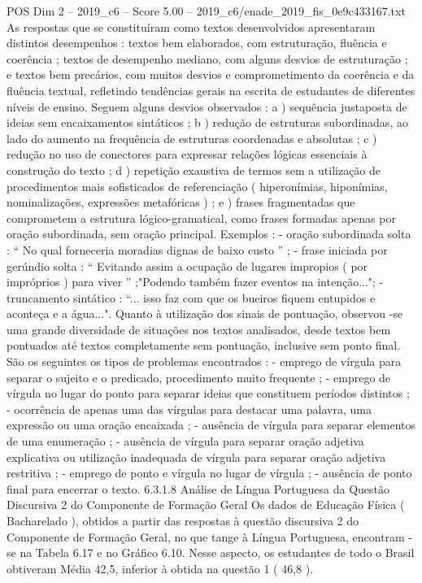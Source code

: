 \begin{textsample}{POS Dim 2 – 2019\_c6 – Score 5.00 – 2019\_c6/enade\_2019\_fis\_0e9c433167.txt}
As respostas que se constituíram como textos desenvolvidos apresentaram distintos desempenhos : textos bem elaborados, com estruturação, fluência e coerência ; textos de desempenho mediano, com alguns desvios de estruturação ; e textos bem precários, com muitos desvios e comprometimento da coerência e da fluência textual, refletindo tendências gerais na escrita de estudantes de diferentes níveis de ensino.
Seguem alguns desvios observados : a ) sequência justaposta de ideias sem encaixamentos sintáticos ; b ) redução de estruturas subordinadas, ao lado do aumento na frequência de estruturas coordenadas e absolutas ; c ) redução no uso de conectores para expressar relações lógicas essenciais à construção do texto ; d ) repetição exaustiva de termos sem a utilização de procedimentos mais sofisticados de referenciação ( hiperonímias, hiponímias, nominalizações, expressões metafóricas ) ; e ) frases fragmentadas que comprometem a estrutura lógico-gramatical, como frases formadas apenas por oração subordinada, sem oração principal.
Exemplos : - oração subordinada solta : “ No qual forneceria moradias dignas de baixo custo ” ; - frase iniciada por gerúndio solta : “ Evitando assim a ocupação de lugares impropios ( por impróprios ) para viver ” ;"Podendo também fazer eventos na intenção..."; - truncamento sintático : “... isso faz com que os bueiros fiquem entupidos e aconteça e a água...".
Quanto à utilização dos sinais de pontuação, observou -se uma grande diversidade de situações nos textos analisados, desde textos bem pontuados até textos completamente sem pontuação, inclusive sem ponto final.
São os seguintes os tipos de problemas encontrados : - emprego de vírgula para separar o sujeito e o predicado, procedimento muito frequente ; - emprego de vírgula no lugar do ponto para separar ideias que constituem períodos distintos ; - ocorrência de apenas uma das vírgulas para destacar uma palavra, uma expressão ou uma oração encaixada ; - ausência de vírgula para separar elementos de uma enumeração ; - ausência de vírgula para separar oração adjetiva explicativa ou utilização inadequada de vírgula para separar oração adjetiva restritiva ; - emprego de ponto e vírgula no lugar de vírgula ; - ausência de ponto final para encerrar o texto. 6.3.1.8 Análise de Língua Portuguesa da Questão Discursiva 2 do Componente de Formação Geral Os dados de Educação Física ( Bacharelado ), obtidos a partir das respostas à questão discursiva 2 do Componente de Formação Geral, no que tange à Língua Portuguesa, encontram -se na Tabela 6.17 e no Gráfico 6.10.
Nesse aspecto, os estudantes de todo o Brasil obtiveram Média 42,5, inferior à obtida na questão 1 ( 46,8 ).

\end{textsample}
